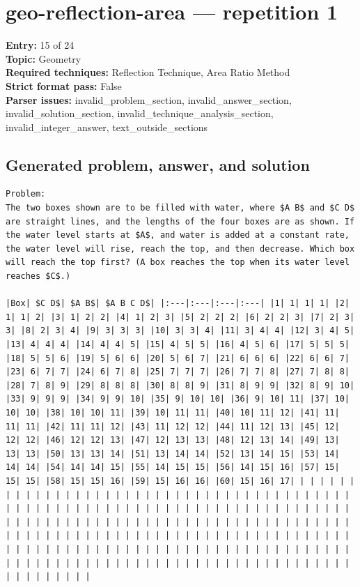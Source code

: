 \documentclass[11pt]{article}
\begin{document}
\section{geo-reflection-area --- repetition 1}
{\color{metadata}
\textbf{Entry:} 15 of 24\\
\textbf{Topic:} Geometry\\
\textbf{Required techniques:} Reflection Technique, Area Ratio Method\\
\textbf{Strict format pass:} False\\
\textbf{Parser issues:} invalid\_problem\_section, invalid\_answer\_section, invalid\_solution\_section, invalid\_technique\_analysis\_section, invalid\_integer\_answer, text\_outside\_sections
}

\subsection*{Generated problem, answer, and solution}
\begin{Verbatim}[breaklines=true,breakanywhere=true,fontsize=\small]
Problem:
The two boxes shown are to be filled with water, where $A B$ and $C D$ are straight lines, and the lengths of the four boxes are as shown. If the water level starts at $A$, and water is added at a constant rate, the water level will rise, reach the top, and then decrease. Which box will reach the top first? (A box reaches the top when its water level reaches $C$.)

|Box| $C D$| $A B$| $A B C D$| |:---|:---|:---|:---| |1| 1| 1| 1| |2| 1| 1| 2| |3| 1| 2| 2| |4| 1| 2| 3| |5| 2| 2| 2| |6| 2| 2| 3| |7| 2| 3| 3| |8| 2| 3| 4| |9| 3| 3| 3| |10| 3| 3| 4| |11| 3| 4| 4| |12| 3| 4| 5| |13| 4| 4| 4| |14| 4| 4| 5| |15| 4| 5| 5| |16| 4| 5| 6| |17| 5| 5| 5| |18| 5| 5| 6| |19| 5| 6| 6| |20| 5| 6| 7| |21| 6| 6| 6| |22| 6| 6| 7| |23| 6| 7| 7| |24| 6| 7| 8| |25| 7| 7| 7| |26| 7| 7| 8| |27| 7| 8| 8| |28| 7| 8| 9| |29| 8| 8| 8| |30| 8| 8| 9| |31| 8| 9| 9| |32| 8| 9| 10| |33| 9| 9| 9| |34| 9| 9| 10| |35| 9| 10| 10| |36| 9| 10| 11| |37| 10| 10| 10| |38| 10| 10| 11| |39| 10| 11| 11| |40| 10| 11| 12| |41| 11| 11| 11| |42| 11| 11| 12| |43| 11| 12| 12| |44| 11| 12| 13| |45| 12| 12| 12| |46| 12| 12| 13| |47| 12| 13| 13| |48| 12| 13| 14| |49| 13| 13| 13| |50| 13| 13| 14| |51| 13| 14| 14| |52| 13| 14| 15| |53| 14| 14| 14| |54| 14| 14| 15| |55| 14| 15| 15| |56| 14| 15| 16| |57| 15| 15| 15| |58| 15| 15| 16| |59| 15| 16| 16| |60| 15| 16| 17| | | | | | | | | | | | | | | | | | | | | | | | | | | | | | | | | | | | | | | | | | | | | | | | | | | | | | | | | | | | | | | | | | | | | | | | | | | | | | | | | | | | | | | | | | | | | | | | | | | | | | | | | | | | | | | | | | | | | | | | | | | | | | | | | | | | | | | | | | | | | | | | | | | | | | | | | | | | | | | | | | | | | | | | | | | | | | | | | | | | | | | | | | | | | | | | | | | | | | | | | | | | | | | | | | | | | | | | | | | | | | | | | |
\end{Verbatim}
\clearpage
\end{document}
